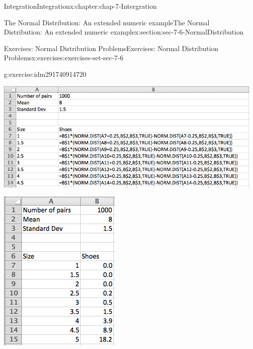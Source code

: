 \documentclass[oneside,10pt,]{book}
\numberwithin{equation}{section}
\begin{document}
\begin{chapterptx}{Integration}{}{Integration}{}{}{x:chapter:chap-7-Intergration}
\begin{sectionptx}{The Normal Distribution: An extended numeric example}{}{The Normal Distribution: An extended numeric example}{}{}{x:section:sec-7-6-NormalDistribution}
\begin{exercises-subsection}{Exercises: Normal Distribution Problems}{}{Exercises: Normal Distribution Problems}{}{}{x:exercises:exercises-set-sec-7-6}
\begin{divisionexercise}{7}{}{}{g:exercise:idm291740914720}
\begin{sidebyside}{1}{0.1}{0.1}{0}
\begin{sbspanel}{0.8}
\includegraphics[width=\linewidth]{images/sec7-6-sol7a.png}
\end{sbspanel}%
\end{sidebyside}%
\begin{sidebyside}{1}{0.3}{0.3}{0}%
\begin{sbspanel}{0.4}%
\includegraphics[width=\linewidth]{images/sec7-6-sol7b.png}
\end{sbspanel}%
\end{sidebyside}%

\end{divisionexercise}
\end{exercises-subsection}
\end{sectionptx}
\end{chapterptx}
\end{document}

